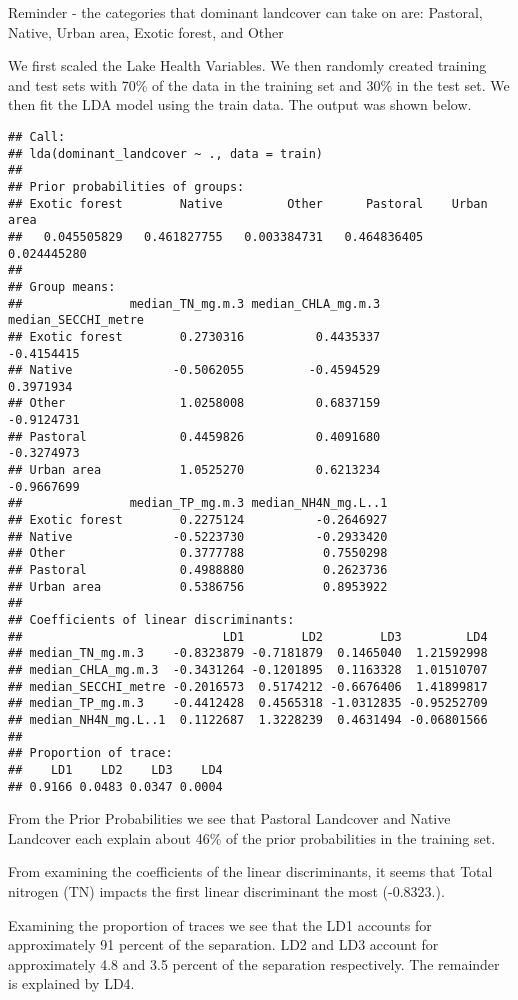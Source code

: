 \documentclass[
]{article}
\begin{document}
Reminder - the categories that dominant landcover can take on are: Pastoral, Native, Urban area, Exotic forest, and Other

We first scaled the Lake Health Variables. We then randomly created training and test sets with 70\% of the data in the training set and 30\% in the test set. We then fit the LDA model using the train data. The output was shown below.

\begin{verbatim}
## Call:
## lda(dominant_landcover ~ ., data = train)
## 
## Prior probabilities of groups:
## Exotic forest        Native         Other      Pastoral    Urban area 
##   0.045505829   0.461827755   0.003384731   0.464836405   0.024445280 
## 
## Group means:
##               median_TN_mg.m.3 median_CHLA_mg.m.3 median_SECCHI_metre
## Exotic forest        0.2730316          0.4435337          -0.4154415
## Native              -0.5062055         -0.4594529           0.3971934
## Other                1.0258008          0.6837159          -0.9124731
## Pastoral             0.4459826          0.4091680          -0.3274973
## Urban area           1.0525270          0.6213234          -0.9667699
##               median_TP_mg.m.3 median_NH4N_mg.L..1
## Exotic forest        0.2275124          -0.2646927
## Native              -0.5223730          -0.2933420
## Other                0.3777788           0.7550298
## Pastoral             0.4988880           0.2623736
## Urban area           0.5386756           0.8953922
## 
## Coefficients of linear discriminants:
##                            LD1        LD2        LD3         LD4
## median_TN_mg.m.3    -0.8323879 -0.7181879  0.1465040  1.21592998
## median_CHLA_mg.m.3  -0.3431264 -0.1201895  0.1163328  1.01510707
## median_SECCHI_metre -0.2016573  0.5174212 -0.6676406  1.41899817
## median_TP_mg.m.3    -0.4412428  0.4565318 -1.0312835 -0.95252709
## median_NH4N_mg.L..1  0.1122687  1.3228239  0.4631494 -0.06801566
## 
## Proportion of trace:
##    LD1    LD2    LD3    LD4 
## 0.9166 0.0483 0.0347 0.0004
\end{verbatim}

From the Prior Probabilities we see that Pastoral Landcover and Native Landcover each explain about 46\% of the prior probabilities in the training set.

From examining the coefficients of the linear discriminants, it seems that Total nitrogen (TN) impacts the first linear discriminant the most (-0.8323.).

Examining the proportion of traces we see that the LD1 accounts for approximately 91 percent of the separation. LD2 and LD3 account for approximately 4.8 and 3.5 percent of the separation respectively. The remainder is explained by LD4.
\end{document}
